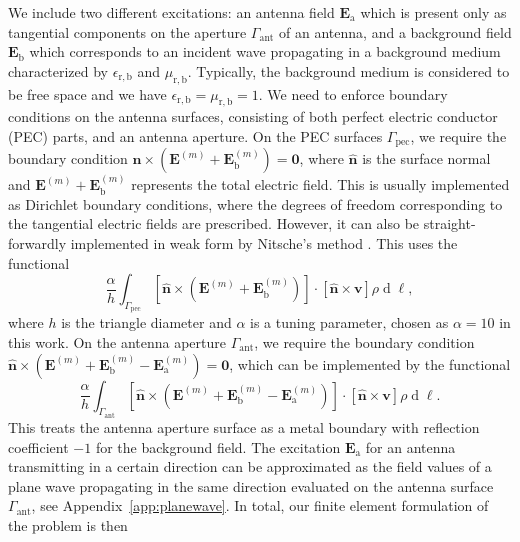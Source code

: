\documentclass[a4paper,12pt]{article}
\renewcommand{\vec}[1]{\boldsymbol{#1}}
\newcommand{\unitvec}[1]{\hat{\vec{#1}}}
\newcommand{\mrm}[1]{\mathrm{#1}}
\newcommand{\diff}{\operatorname{d}\!}
\newcommand{\Ev}{\vec{E}}
\newcommand{\Zv}{\vec{0}}
\newcommand{\nuv}{\unitvec{n}}
\newcommand{\vv}{\vec{v}}
\begin{document}
We include two different excitations: an antenna field $\Ev_{\mrm{a}}$
which is present only as tangential components on the aperture
$\Gamma_{\mrm{ant}}$ of an antenna, and a background field
$\Ev_{\mrm{b}}$ which corresponds to an incident wave propagating in a
background medium characterized by $\epsilon_{\mrm{r,b}}$ and
$\mu_{\mrm{r,b}}$. Typically, the background medium is considered to
be free space and we have
$\epsilon_{\mrm{r,b}} = \mu_{\mrm{r,b}} = 1$. We need to enforce
boundary conditions on the antenna surfaces, consisting of both
perfect electric conductor (PEC) parts, and an antenna aperture. On
the PEC surfaces $\Gamma_{\mrm{pec}}$, we require the boundary
condition $\nuv\times(\Ev^{(m)} + \Ev_{\mrm{b}}^{(m)}) = \Zv$, where
$\nuv$ is the surface normal and $\Ev^{(m)}+\Ev_{\mrm{b}}^{(m)}$
represents the total electric field. This is usually implemented as
Dirichlet boundary conditions, where the degrees of freedom
corresponding to the tangential electric fields are
prescribed. However, it can also be straight-forwardly implemented in
weak form by Nitsche's method \cite{Nitsche1971}. This uses the
functional
\begin{equation}
  \frac{\alpha}{h}\int_{\Gamma_{\mrm{pec}}} [\nuv\times(\Ev^{(m)} + \Ev_{\mrm{b}}^{(m)})] \cdot [\nuv\times\vv] \rho\diff\ell,
\end{equation}
where $h$ is the triangle diameter and $\alpha$ is a tuning parameter,
chosen as $\alpha=10$ in this work. On the antenna aperture
$\Gamma_{\mrm{ant}}$, we require the boundary condition
$\nuv\times(\Ev^{(m)}+\Ev_{\mrm{b}}^{(m)}-\Ev_{\mrm{a}}^{(m)})=\Zv$,
which can be implemented by the functional
\begin{equation}
  \frac{\alpha}{h}\int_{\Gamma_{\mrm{ant}}} [\nuv\times(\Ev^{(m)} + \Ev_{\mrm{b}}^{(m)} - \Ev_{\mrm{a}}^{(m)})] \cdot [\nuv\times\vv] \rho\diff\ell.
\end{equation}
This treats the antenna aperture surface as a metal boundary with
reflection coefficient $-1$ for the background field. The excitation
$\Ev_{\mrm{a}}$ for an antenna transmitting in a certain direction can
be approximated as the field values of a plane wave propagating in the
same direction evaluated on the antenna surface $\Gamma_{\mrm{ant}}$,
see Appendix~\ref{app:planewave}. In total, our finite element
formulation of the problem is then
\end{document}
